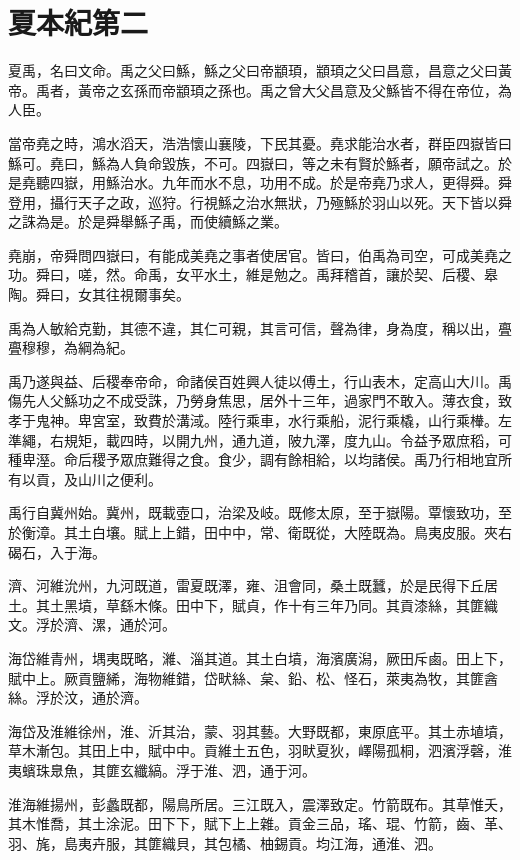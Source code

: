 \chapter{夏本紀第二}

夏禹，名曰文命。禹之父曰鯀，鯀之父曰帝顓頊，顓頊之父曰昌意，昌意之父曰黃帝。禹者，黃帝之玄孫而帝顓頊之孫也。禹之曾大父昌意及父鯀皆不得在帝位，為人臣。

當帝堯之時，鴻水滔天，浩浩懷山襄陵，下民其憂。堯求能治水者，群臣四嶽皆曰鯀可。堯曰，鯀為人負命毀族，不可。四嶽曰，等之未有賢於鯀者，願帝試之。於是堯聽四嶽，用鯀治水。九年而水不息，功用不成。於是帝堯乃求人，更得舜。舜登用，攝行天子之政，巡狩。行視鯀之治水無狀，乃殛鯀於羽山以死。天下皆以舜之誅為是。於是舜舉鯀子禹，而使續鯀之業。

堯崩，帝舜問四嶽曰，有能成美堯之事者使居官。皆曰，伯禹為司空，可成美堯之功。舜曰，嗟，然。命禹，女平水土，維是勉之。禹拜稽首，讓於契、后稷、皋陶。舜曰，女其往視爾事矣。

禹為人敏給克勤，其德不違，其仁可親，其言可信，聲為律，身為度，稱以出，亹亹穆穆，為綱為紀。

禹乃遂與益、后稷奉帝命，命諸侯百姓興人徒以傅土，行山表木，定高山大川。禹傷先人父鯀功之不成受誅，乃勞身焦思，居外十三年，過家門不敢入。薄衣食，致孝于鬼神。卑宮室，致費於溝淢。陸行乘車，水行乘船，泥行乘橇，山行乘檋。左準繩，右規矩，載四時，以開九州，通九道，陂九澤，度九山。令益予眾庶稻，可種卑溼。命后稷予眾庶難得之食。食少，調有餘相給，以均諸侯。禹乃行相地宜所有以貢，及山川之便利。

禹行自冀州始。冀州，既載壺口，治梁及岐。既修太原，至于嶽陽。覃懷致功，至於衡漳。其土白壤。賦上上錯，田中中，常、衛既從，大陸既為。鳥夷皮服。夾右碣石，入于海。

濟、河維沇州，九河既道，雷夏既澤，雍、沮會同，桑土既蠶，於是民得下丘居土。其土黑墳，草繇木條。田中下，賦貞，作十有三年乃同。其貢漆絲，其篚織文。浮於濟、漯，通於河。

海岱維青州，堣夷既略，濰、淄其道。其土白墳，海濱廣潟，厥田斥鹵。田上下，賦中上。厥貢鹽絺，海物維錯，岱畎絲、枲、鉛、松、怪石，萊夷為牧，其篚酓絲。浮於汶，通於濟。

海岱及淮維徐州，淮、沂其治，蒙、羽其藝。大野既都，東原底平。其土赤埴墳，草木漸包。其田上中，賦中中。貢維土五色，羽畎夏狄，嶧陽孤桐，泗濱浮磬，淮夷蠙珠臮魚，其篚玄纖縞。浮于淮、泗，通于河。

淮海維揚州，彭蠡既都，陽鳥所居。三江既入，震澤致定。竹箭既布。其草惟夭，其木惟喬，其土涂泥。田下下，賦下上上雜。貢金三品，瑤、琨、竹箭，齒、革、羽、旄，島夷卉服，其篚織貝，其包橘、柚錫貢。均江海，通淮、泗。


